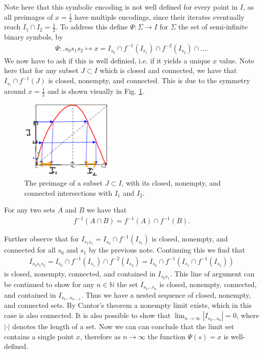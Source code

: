 \begin{ex}
Note here that this symbolic encoding is not well defined for every point in $I$, as all preimages of $x=\frac{1}{2}$ have multiple encodings, since their iterates eventually reach $I_{1}\cap I_{2} =\frac{1}{2}$. To address this define $\Psi:\Sigma \to I$ for $\Sigma$ the set of semi-infinite binary symbols, by
\begin{align}
	\Psi: \bm{.} s_0s_1s_2 \mapsto x = I_{s_0} \cap f^{-1}(I_{s_1}) \cap f^{-2}(I_{s_2}) \cap \ldots.
\end{align}
We now have to ask if this is well definied, i.e. if it yields a unique $x$ value. Note here that for any subset $J\subset I$ which is closed and connected, we have that $I_{s_i}\cap f^{-1}(J)$ is closed, nonempty, and connected. This is due to the symmetry around $x=\frac{1}{2}$ and is shown visually in Fig. \ref{fig:J_preimage}.
\begin{figure}[h!]
	\centering
	\includegraphics[width=0.4\textwidth]{figures/ch6/24J_preimage.png}
	\caption{The preimage of a subset $J\subset I$, with its closed, nonempty, and connected intersections with $I_1$ and $I_2$.}
	\label{fig:J_preimage}
\end{figure}

\begin{remark}[]
	For any two sets $A$ and $B$ we have that 
	\begin{align}
		f^{-1}(A \cap B) = f^{-1}(A) \cap f^{-1}(B).
	\end{align}
\end{remark}

Further observe that for $I_{s_1s_1}=I_{s_0}\cap f^{-1}(I_{s_1})$ is closed, nonempty, and connected for all $s_0$ and $s_1$ by the previous note. Continuing this we find that
\begin{align}
	I_{s_0s_1s_2} = I_{s_0} \cap f^{-1}(I_{s_1}) \cap f^{-2}(I_{s_2}) = I_{s_0} \cap f^{-1} \left( I_{s_1} \cap f^{-1}(I_{s_2})\right) 
\end{align}
is closed, nonempty, connected, and contained in $I _{s_0s_1}$. This line of argument can be continued to show for any $n \in \mathbb{N}$ the set $I_{s_0\ldots s_n}$ is closed, nonempty, connected, and contained in $I_{s_0 \ldots s_{n-1}}$. Thus we have a nested sequence of closed, nonempty, and connected sets. By Cantor's theorem a nonempty limit exists, which in this case is also connected. It is also possible to show that $\lim_{n\to \infty }|I_{s_0 \ldots s_n}| = 0$, where $|\cdot|$ denotes the length of a set. Now we can can conclude that the limit set contains a single point $x$, therefore as $n\to \infty $ the function $\Psi(s)=x$ is well-defined.


\end{ex}
